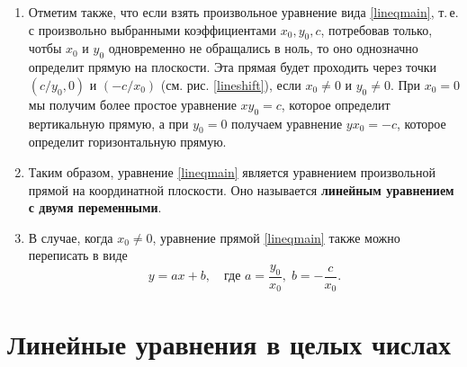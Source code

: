 \begin{enumerate}
\item Отметим также, что если взять произвольное уравнение вида \eqref{lineqmain}, т.\,е. с произвольно выбранными коэффициентами $x_0,y_0,c$, потребовав только, чотбы $x_0$ и $y_0$ одновременно не обращались в ноль, то оно однозначно определит прямую на плоскости. Эта прямая будет проходить через точки $(c/y_0,0)$ и $(-c/x_0)$ (см. рис. \ref{lineshift}), если $x_0\ne 0$ и $y_0\ne 0$. При $x_0=0$ мы получим более простое уравнение $xy_0=c$, которое определит вертикальную прямую, а при $y_0=0$ получаем уравнение $yx_0=-c$, которое определит горизонтальную прямую.

\item Таким образом, уравнение \eqref{lineqmain} является уравнением произвольной прямой на координатной плоскости. Оно называется \textbf{линейным уравнением с двумя переменными}.
\item В случае, когда $x_0\ne 0$, уравнение прямой \eqref{lineqmain} также можно переписать в виде
$$
y = ax+b,\quad\mbox{где }a=\frac{y_0}{x_0},\; b=-\frac{c}{x_0}.
$$
\end{enumerate}


\section{Линейные уравнения в целых числах}


